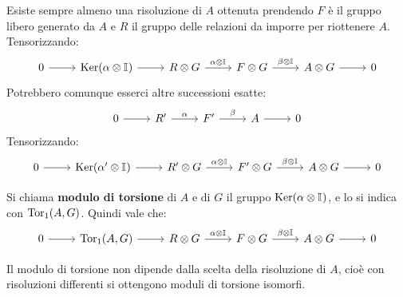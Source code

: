 \begin{osservation}
  Esiste sempre almeno una risoluzione di $ A $ ottenuta prendendo $ F $ è il
  gruppo libero generato da $ A $ e $ R $ il gruppo delle relazioni da imporre
  per riottenere $ A $. Tensorizzando:
  \[
    \begin{tikzcd}
      0 \rar & \ker{\alpha \otimes \Id{}} \rar & R \otimes G \rar{\alpha \otimes \Id{}} & F \otimes G \rar{\beta \otimes \Id{}} & A \otimes G \rar & 0
    \end{tikzcd}
  \]
  Potrebbero comunque esserci altre successioni esatte:
  \[
    \begin{tikzcd}
      0 \rar & R' \rar{\alpha} & F' \rar{\beta} & A \rar & 0
    \end{tikzcd}
  \]
  Tensorizzando:
  \[
    \begin{tikzcd}
      0 \rar & \ker{\alpha' \otimes \Id{}} \rar & R' \otimes G \rar{\alpha \otimes \Id{}} & F' \otimes G \rar{\beta \otimes \Id{}} & A \otimes G \rar & 0
    \end{tikzcd}
  \]
\end{osservation}

\begin{definition}
  Si chiama \textbf{modulo di torsione} di $ A $ e di $ G $ il
  gruppo $ \mathrm{Ker}( \alpha \otimes \mathbb{I}_{}) $, e lo si indica con $ \mathrm{Tor_1}( A,G) $. Quindi vale che:
    \[
    \begin{tikzcd}
      0 \rar & \tor{A,G} \rar & R \otimes G \rar{\alpha \otimes \Id{}} & F \otimes G \rar{\beta \otimes \Id{}} & A \otimes G \rar & 0
    \end{tikzcd}
  \]
\end{definition}
\begin{lemma}
  Il modulo di torsione non dipende dalla scelta della risoluzione di $ A $, cioè con risoluzioni
  differenti si ottengono moduli di torsione isomorfi.
\end{lemma}

